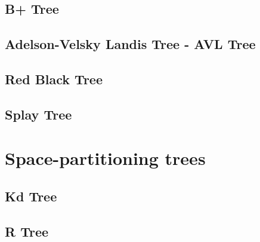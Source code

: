 \subsection{B+ Tree}

\subsection{Adelson-Velsky Landis Tree - AVL Tree}
\subsection{Red Black Tree}
\subsection{Splay Tree}


\section{Space-partitioning trees}
\subsection{Kd Tree}
\subsection{R Tree}